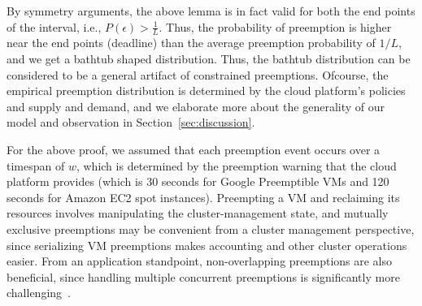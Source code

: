 By symmetry arguments, the above lemma is in fact valid for both the end points of the interval, i.e., $P(\epsilon) > \frac{1}{L}$.
Thus, the probability of preemption is higher near the end points (deadline) than the average preemption probability of $1/L$, and we get a bathtub shaped distribution.
Thus, the bathtub distribution can be considered to be a general artifact of constrained preemptions. Ofcourse, the empirical preemption distribution is determined by the cloud platform's policies and supply and demand, and we elaborate more about the generality of our model and observation in Section~\ref{sec:discussion}. 


For the above proof, we assumed that each preemption event occurs over a timespan of $w$, which is determined by the preemption warning that the cloud platform provides (which is 30 seconds for Google Preemptible VMs and 120 seconds for Amazon EC2 spot instances). 
Preempting a VM and reclaiming its resources involves manipulating the cluster-management state, and mutually exclusive preemptions may be convenient from  a cluster management perspective, since serializing VM preemptions makes accounting and other cluster operations easier.
From an application standpoint, non-overlapping preemptions are also beneficial, since handling multiple concurrent preemptions is significantly more challenging~\cite{exosphere}. 





